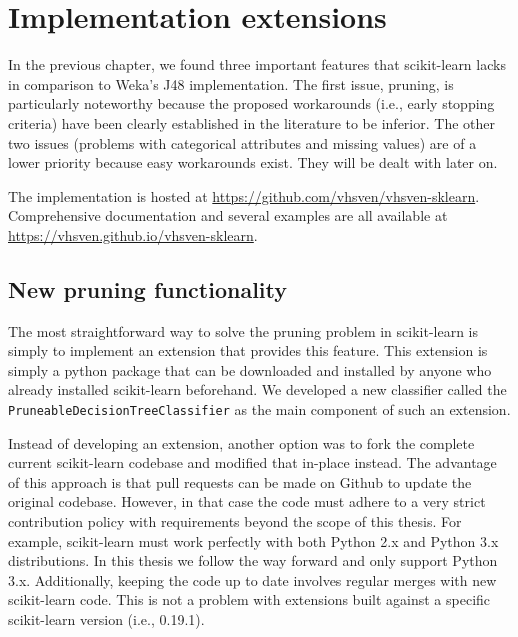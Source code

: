 \chapter{Implementation extensions}\label{cha:software_new}
In the previous chapter, we found three important features that scikit-learn lacks in comparison to Weka's J48 implementation. The first issue, pruning, is particularly noteworthy because the proposed workarounds (i.e., early stopping criteria) have been clearly established in the literature to be inferior. The other two issues (problems with categorical attributes and missing values) are of a lower priority because easy workarounds exist. They will be dealt with later on.


The implementation is hosted at \url{https://github.com/vhsven/vhsven-sklearn}. Comprehensive documentation and several examples are all available at \url{https://vhsven.github.io/vhsven-sklearn}.

\section{New pruning functionality}
The most straightforward way to solve the pruning problem in scikit-learn is simply to implement an extension that provides this feature. This extension is simply a python package that can be downloaded and installed by anyone who already installed scikit-learn beforehand. We developed a new classifier called the \texttt{PruneableDecisionTreeClassifier} as the main component of such an extension. 

Instead of developing an extension, another option was to fork the complete current scikit-learn codebase and modified that in-place instead. The advantage of this approach is that pull requests can be made on Github to update the original codebase. However, in that case the code must adhere to a very strict contribution policy with requirements beyond the scope of this thesis. For example, scikit-learn must work perfectly with both Python 2.x and Python 3.x distributions. In this thesis we follow the way forward and only support Python 3.x. Additionally, keeping the code up to date involves regular merges with new scikit-learn code. This is not a problem with extensions built against a specific scikit-learn version (i.e., 0.19.1).

